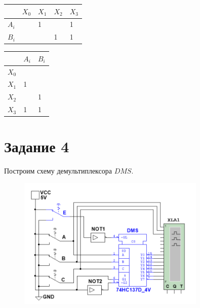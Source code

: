 \documentclass[bachelor, och, labwork]{shiza}
\begin{document}
\begin{table}[H]
    \begin{center}
    \begin{tabular}{|l|l|l|l|l|}
    \hline
          & $X_0$ & $X_1$ & $X_2$ & $X_3$ \\ \hline
    $A_i$ &       & 1     &       & 1     \\ \hline
    $B_i$ &       &       & 1     & 1     \\ \hline
    \end{tabular}
    \end{center}
\end{table}

\begin{table}[H]
    \begin{center}
    \begin{tabular}{|l|l|l|}
    \hline
          & $A_i$ & $B_i$ \\ \hline
    $X_0$ &       &       \\ \hline
    $X_1$ & 1     &       \\ \hline
    $X_2$ &       & 1     \\ \hline
    $X_3$ & 1     & 1     \\ \hline
    \end{tabular}
    \end{center}
\end{table}


\section{Задание 4}
Построим схему демультиплексора $DMS$.

\begin{figure}[H]
    \centering
    \includegraphics[width=0.8\textwidth]{pic2/3.png}
    \caption{}
\end{figure}
\end{document}
